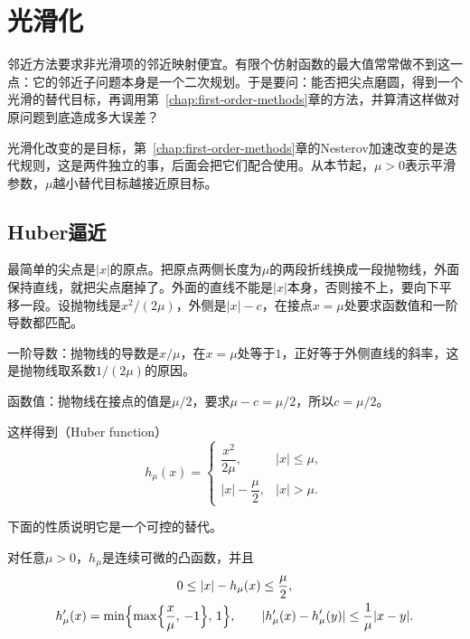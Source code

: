 \section{光滑化}
\label{sec:ns-smoothing}

邻近方法要求非光滑项的邻近映射便宜。有限个仿射函数的最大值常常做不到这一点：它的邻近子问题本身是一个二次规划。于是要问：能否把尖点磨圆，得到一个光滑的替代目标，再调用第~\ref{chap:first-order-methods}章的方法，并算清这样做对原问题到底造成多大误差？

光滑化改变的是目标，第~\ref{chap:first-order-methods}章的Nesterov加速改变的是迭代规则，这是两件独立的事，后面会把它们配合使用。从本节起，$\mu>0$表示平滑参数，$\mu$越小替代目标越接近原目标。

\subsection{Huber逼近}
\label{sec:ns-huber}

最简单的尖点是$\lvert x\rvert$的原点。把原点两侧长度为$\mu$的两段折线换成一段抛物线，外面保持直线，就把尖点磨掉了。外面的直线不能是$\lvert x\rvert$本身，否则接不上，要向下平移一段。设抛物线是$x^2/(2\mu)$，外侧是$\lvert x\rvert-c$，在接点$x=\mu$处要求函数值和一阶导数都匹配。

一阶导数：抛物线的导数是$x/\mu$，在$x=\mu$处等于$1$，正好等于外侧直线的斜率，这是抛物线取系数$1/(2\mu)$的原因。

函数值：抛物线在接点的值是$\mu/2$，要求$\mu-c=\mu/2$，所以$c=\mu/2$。

这样得到（Huber function）
\begin{equation}
 h_\mu(x)=\begin{cases}
 \dfrac{x^2}{2\mu},&\lvert x\rvert\leq\mu,\\
 \lvert x\rvert-\dfrac{\mu}{2},&\lvert x\rvert>\mu.
 \end{cases}
 \label{eq:ns-huber}
\end{equation}

下面的性质说明它是一个可控的替代。

\begin{theorem}[Huber逼近的性质]
\label{thm:ns-huber}
对任意$\mu>0$，$h_\mu$是连续可微的凸函数，并且
\begin{gather}
 0\leq\lvert x\rvert-h_\mu(x)\leq\frac{\mu}{2},\label{eq:ns-huber-gap}\\
 h_\mu'(x)=\min\Bigl\{\max\Bigl\{\frac{x}{\mu},\,-1\Bigr\},\,1\Bigr\},\qquad
 \lvert h_\mu'(x)-h_\mu'(y)\rvert\leq\frac{1}{\mu}\lvert x-y\rvert.\label{eq:ns-huber-grad}
\end{gather}
\end{theorem}

